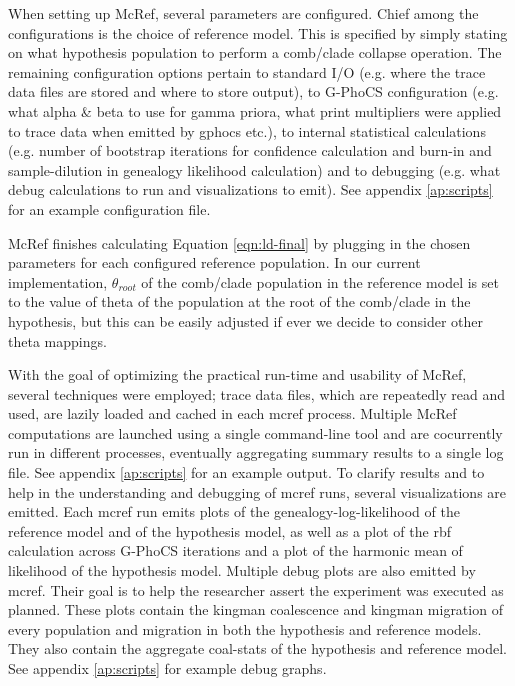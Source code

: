 \documentclass[11pt]{article}
\newcommand{\1}{\mathbbm{1}}
\newcommand{\gp}{G-PhoCS }
\begin{document}
When setting up McRef, several parameters are configured. 
%
Chief among the configurations is the choice of reference model. This is specified by simply stating on what hypothesis population to perform a comb/clade collapse operation.
%
The remaining configuration options pertain to standard I/O (e.g. where the trace data files are stored and where to store output), to \gp configuration (e.g. what alpha \& beta to use for gamma priora, what print multipliers were applied to trace data when emitted by gphocs etc.), to internal statistical calculations (e.g. number of bootstrap iterations for confidence calculation and burn-in and sample-dilution in genealogy likelihood calculation) and to debugging (e.g. what debug calculations to run and visualizations to emit). 
%
See appendix \ref{ap:scripts} for an example configuration file.

McRef finishes calculating Equation \ref{eqn:ld-final} by plugging in the chosen parameters for each configured reference population. In our current implementation, $\theta_{root}$ of the comb/clade population in the reference model is set to the value of theta of the population at the root of the comb/clade in the hypothesis, but this can be easily adjusted if ever we decide to consider other theta mappings. 

With the goal of optimizing the practical run-time and usability of McRef, several techniques were employed; trace data files, which are repeatedly read and used, are lazily loaded and cached in each mcref process. Multiple McRef computations are launched using a single command-line tool and are cocurrently run in different processes, eventually aggregating summary results to a single log file. See appendix \ref{ap:scripts} for an example output.
%
To clarify results and to help in the understanding and debugging of mcref runs, several visualizations are emitted. Each mcref run emits plots of the genealogy-log-likelihood of the reference model and of the hypothesis model, as well as a plot of the rbf calculation across \gp iterations and a plot of the harmonic mean of likelihood of the hypothesis model. 
%
Multiple debug plots are also emitted by mcref. Their goal is to help the researcher assert the experiment was executed as planned. These plots contain the kingman coalescence and kingman migration of every population and migration in both the hypothesis and reference models. They also contain the aggregate coal-stats of the hypothesis and reference model. See appendix \ref{ap:scripts} for example debug graphs.
\end{document}
